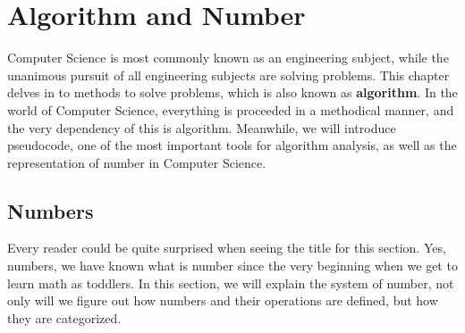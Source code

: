 \chapterspaceabove{5.75cm} %
\chapterspacebelow{10cm} %
\chapter{Algorithm and Number}

Computer Science is most commonly known as an engineering subject, while the unanimous pursuit of all engineering subjects are solving problems. This chapter delves in to methods to solve problems, which is also known as \textbf{algorithm}. In the world of Computer Science, everything is proceeded in a methodical manner, and the very dependency of this is algorithm. Meanwhile, we will introduce pseudocode, one of the most important tools for algorithm analysis, as well as the representation of number in Computer Science.


\section{Numbers}
Every reader could be quite surprised when seeing the title for this section. Yes, numbers, we have known what is number since the very beginning when we get to learn math as toddlers. In this section, we will explain the system of number, not only will we figure out how numbers and their operations are defined, but how they are categorized.
